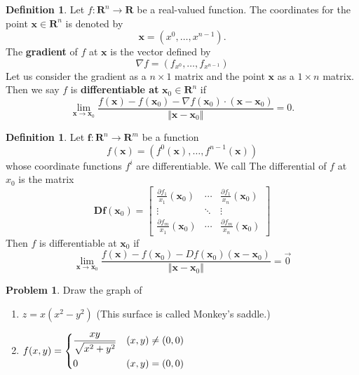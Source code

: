 \documentclass[t]{beamer}
\theoremstyle{plain}
\theoremstyle{definition}
\newtheorem{defn}[thm]{Definition}
\newtheorem{prob}[thm]{Problem}
\begin{document}
\begin{frame}
\begin{defn}
Let $f:\mathbf R^n\to\mathbf R$ be a real-valued function.
The coordinates for the point $\mathbf x\in \mathbf R^n$ is denoted by 
\[\mathbf x = (x^{0}, \ldots, x^{n-1}).\]
The \textbf{gradient} of $f$ at $\mathbf x$ is the vector defined by
	\[ \nabla f = (f_{x^{0}}, \ldots, f_{x^{n-1}}) \]
Let us consider the gradient as a $n\times 1$ matrix
and the point $\mathbf x$ as a $1\times n$ matrix.
Then we say $f$ is \textbf{differentiable at} $\mathbf x_0\in\mathbf R^n$ if 
\[\lim_{\mathbf x\to\mathbf x_0}
	\frac{f(\mathbf x) - f(\mathbf x_0) 
	- \nabla f(\mathbf x_0)
	\cdot(\mathbf x-\mathbf x_0)}
	{\Vert\mathbf x-\mathbf x_0\Vert} = 0.\]
\end{defn}
\end{frame}

\begin{frame}
\begin{defn}
Let $\mathbf f:\mathbf R^n\to\mathbf R^m$ be a function
\[f(\mathbf x) = (f^{0}(\mathbf x), \ldots, f^{n-1}(\mathbf x))\]
whose coordinate functions $f^i$ are differentiable.
We call The differential of $f$ at $x_0$ is the matrix
	\[\mathbf{Df}(\mathbf x_0)
	 = \begin{bmatrix} 
	\frac{\partial f_1}{x_1}(\mathbf x_0) & \cdots 
		& \frac{\partial f_1}{x_n}(\mathbf x_0) \\
	\vdots & \ddots & \vdots \\
	\frac{\partial f_m}{x_1}(\mathbf x_0) & \cdots
		& \frac{\partial f_m}{x_n}(\mathbf x_0) 
	   \end{bmatrix}\]
	Then $f$ is differentiable at $\mathbf x_0$ if
	$$\lim_{\mathbf x\to\mathbf x_0}
	\frac{f(\mathbf x) - f(\mathbf x_0) 
	- Df(\mathbf x_0)
	(\mathbf x - \mathbf x_0)}
	{\Vert \mathbf x - \mathbf x_0\Vert} = \vec 0$$
\end{defn}	
\end{frame}

\begin{frame}
\begin{prob}
	Draw the graph of 
	\begin{enumerate}
	\item $z = x(x^2-y^2)$ 
	(This surface is called Monkey's saddle.)
	\item $f(x,y)=\begin{dcases}
	\frac{xy}{\sqrt{x^2+y^2}} & (x,y)\neq(0,0)\\
	0 & (x,y)=(0,0)\end{dcases}$
	\end{enumerate}
\end{prob}
\end{frame}
\end{document}
